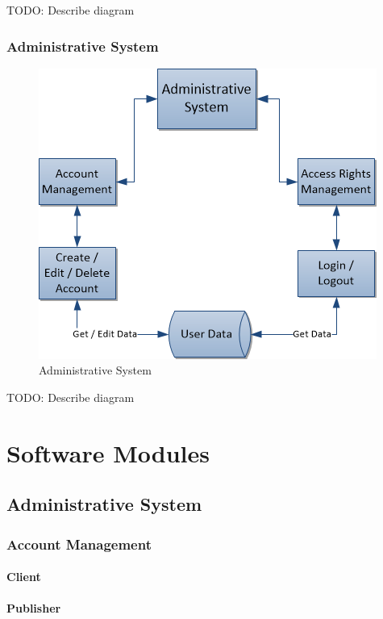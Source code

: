 \documentclass[11pt,a4paper,oneside,svgnames]{report}
\begin{document}
TODO: Describe diagram

\subsection{Administrative System}
\begin{figure}[H]
 \begin{center}
  \includegraphics[width=\textwidth]{Administrative System.png}
 \end{center}
 \caption{Administrative System}
\end{figure}

TODO: Describe diagram

\chapter{Software Modules}

\section{Administrative System}
\subsection{Account Management}

\subsubsection{Client}
\subsubsection{Publisher}
\end{document}
